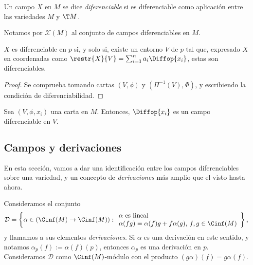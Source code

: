\begin{ndef}
  Un campo $X$ en $M$ se dice \emph{diferenciable} si es diferenciable como
  aplicación entre las variedades $M$ y $\T M$.
\end{ndef}

Notamos por $\mathscr{X}(M)$ al conjunto de campos diferenciables en $M$.

\begin{nprop}
  $X$ es diferenciable en $p$ si, y solo si, existe un entorno $V$ de $p$ tal
  que, expresado $X$ en coordenadas como $\restr{X}{V} =
  \sum_{i=1}^{n}a_{i}\Diffop{x_{i}}$, estas son diferenciables.
\end{nprop}
\begin{proof}
  Se comprueba tomando cartas $(V,\phi)$ y $(\Pi^{-1}(V), \Phi)$, y escribiendo
  la condición de diferenciabilidad.
\end{proof}

\begin{ejemplo}
  Sea $(V,\phi,x_{i})$ una carta en $M$. Entonces, $\Diffop{x_{i}}$ es un campo
  diferenciable en $V$.
\end{ejemplo}

\subsection{Campos y derivaciones}

En esta sección, vamos a dar una identificación entre los campos diferenciables
sobre una variedad, y un concepto de \emph{derivaciones} más amplio que el visto
hasta ahora.

Consideramos el conjunto
\[
  \mathcal{D} = \left\{ \alpha\in (\Cinf(M)\to\Cinf(M)) :
    \begin{array}{l}
      \alpha\text{ es lineal} \\
      \alpha(fg) = \alpha(f)g + f\alpha(g),\, f,g\in\Cinf(M)
    \end{array}
\right\},
\]
y llamamos a sus elementos \emph{derivaciones}. Si $\alpha$ es una derivación en
este sentido, y notamos $\alpha_{p}(f) := \alpha(f)(p)$, entonces $\alpha_{p}$
es una derivación en $p$. Consideramos $\mathcal{D}$ como $\Cinf(M)$-módulo con
el producto $(g\alpha)(f) = g\alpha(f)$.


